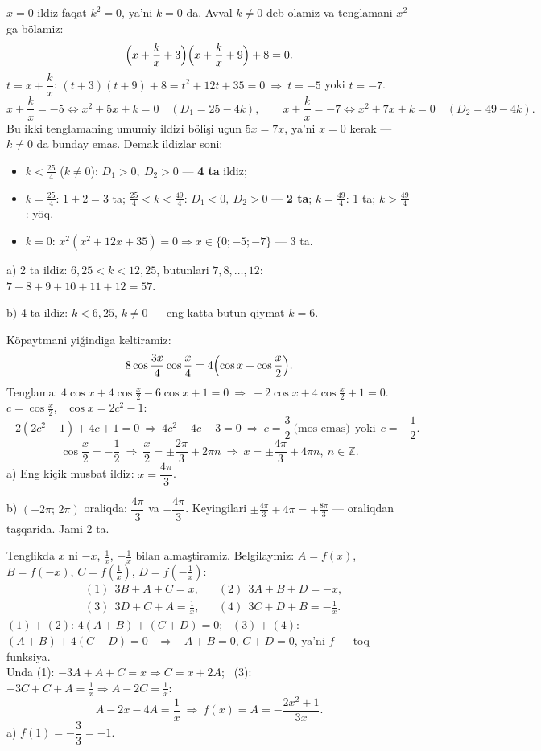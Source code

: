 \newpage
{}
$x=0$ ildiz faqat $k^2=0$, ya'ni $k=0$ da. Avval $k\ne0$ deb olamiz va tenglamani $x^2$ ga bölamiz:
\[\Bigl(x+\frac kx+3\Bigr)\Bigl(x+\frac kx+9\Bigr)+8=0.\]
$t=x+\dfrac kx$: \quad $(t+3)(t+9)+8=t^2+12t+35=0\ \Rightarrow\ t=-5$ yoki $t=-7$.
\[x+\frac kx=-5\iff x^2+5x+k=0\quad(D_1=25-4k),\qquad x+\frac kx=-7\iff x^2+7x+k=0\quad(D_2=49-4k).\]
Bu ikki tenglamaning umumiy ildizi bölişi uçun $5x=7x$, ya'ni $x=0$ kerak — $k\ne0$ da bunday emas. Demak ildizlar soni:
\begin{itemize}\setlength{\itemsep}{1pt}
\item $k<\frac{25}4$ ($k\ne0$): $D_1>0,\ D_2>0$ — \textbf{4 ta} ildiz;
\item $k=\frac{25}4$: $1+2=3$ ta; \quad $\frac{25}4<k<\frac{49}4$: $D_1<0,\ D_2>0$ — \textbf{2 ta}; \quad $k=\frac{49}4$: 1 ta; \quad $k>\frac{49}4$: yöq.
\item $k=0$: $x^2(x^2+12x+35)=0\Rightarrow x\in\{0;-5;-7\}$ — 3 ta.
\end{itemize}
a) 2 ta ildiz: $6{,}25<k<12{,}25$, butunlari $7,8,\dots,12$: \ $7+8+9+10+11+12=57$.

b) 4 ta ildiz: $k<6{,}25$, $k\ne0$ — eng katta butun qiymat $k=6$.

\newpage
{}
Köpaytmani yiğindiga keltiramiz:
\[8\cos\frac{3x}4\cos\frac x4=4\Bigl(\cos x+\cos\frac x2\Bigr).\]
Tenglama: $4\cos x+4\cos\frac x2-6\cos x+1=0\ \Rightarrow\ -2\cos x+4\cos\frac x2+1=0$.\\
$c=\cos\frac x2$, \ $\cos x=2c^2-1$:
\[-2(2c^2-1)+4c+1=0\ \Rightarrow\ 4c^2-4c-3=0\ \Rightarrow\ c=\frac32\ \text{(mos emas)}\ \ \text{yoki}\ \ c=-\frac12.\]
\[\cos\frac x2=-\frac12\ \Rightarrow\ \frac x2=\pm\frac{2\pi}3+2\pi n\ \Rightarrow\ x=\pm\frac{4\pi}3+4\pi n,\ n\in\mathbb Z.\]
a) Eng kiçik musbat ildiz: $x=\dfrac{4\pi}3$.

b) $(-2\pi;\,2\pi)$ oraliqda: $\dfrac{4\pi}3$ va $-\dfrac{4\pi}3$. Keyingilari $\pm\frac{4\pi}3\mp4\pi=\mp\frac{8\pi}3$ — oraliqdan taşqarida. Jami 2 ta.

\newpage
{}
Tenglikda $x$ ni $-x$, $\frac1x$, $-\frac1x$ bilan almaştiramiz. Belgilaymiz: $A=f(x)$, $B=f(-x)$, $C=f\!\left(\frac1x\right)$, $D=f\!\left(-\frac1x\right)$:
\[\begin{aligned}
&(1)\ \ 3B+A+C=x, &&(2)\ \ 3A+B+D=-x,\\
&(3)\ \ 3D+C+A=\tfrac1x, &&(4)\ \ 3C+D+B=-\tfrac1x.
\end{aligned}\]
$(1)+(2)$: $4(A+B)+(C+D)=0$; \ $(3)+(4)$: $(A+B)+4(C+D)=0$ \ $\Rightarrow$ \ $A+B=0$, $C+D=0$, ya'ni $f$ — toq funksiya.\\
Unda (1): $-3A+A+C=x\Rightarrow C=x+2A$; \ (3): $-3C+C+A=\frac1x\Rightarrow A-2C=\frac1x$:
\[A-2x-4A=\frac1x\ \Rightarrow\ f(x)=A=-\frac{2x^2+1}{3x}.\]
a) $f(1)=-\dfrac{3}{3}=-1$.

